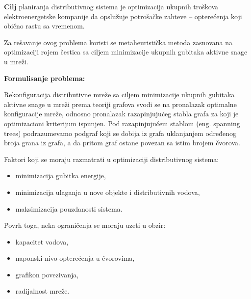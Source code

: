 \documentclass[a4paper]{article}
\begin{document}
\textbf{Cilj} planiranja distributivnog sistema je optimizacija ukupnih troškova elektroenergetske kompanije da opslužuje potrošačke zahteve – opterećenja koji obično rastu sa vremenom.

Za rešavanje ovog problema koristi se metaheuristička metoda zasnovana na optimizaciji rojem čestica sa ciljem minimizacije ukupnih gubitaka aktivne snage u mreži. 

\begin{flushleft}
\textbf{Formulisanje problema:} 
\end{flushleft}

Rekonfiguracija distributivne mreže sa ciljem minimizacije ukupnih gubitaka aktivne snage u mreži prema teoriji grafova svodi se na pronalazak optimalne konfiguracije mreže, odnosno pronalazak razapinjujućeg stabla grafa za koji je optimizacioni kriterijum ispunjen. Pod razapinjujućem stablom (eng. spanning trees) podrazumevamo podgraf koji se dobija iz grafa uklanjanjem određenog broja  grana iz grafa, a da pritom graf ostane povezan sa istim brojem čvorova. 

\vspace{3mm} 

\begin{flushleft}
Faktori koji se moraju razmatrati  u optimizaciji distributivnog sistema:
\end{flushleft}

\begin{itemize}
    \item minimizacija gubitka energije,
    \item minimizacija ulaganja u nove objekte i distributivnih vodova,
    \item maksimizacija pouzdanosti sistema.
\end{itemize}

\begin{flushleft}
Povrh toga, neka ograničenja se moraju uzeti u obzir:
\end{flushleft}

\begin{itemize}
    \item kapacitet vodova,
    \item naponski nivo opterećenja u čvorovima,
    \item grafikon povezivanja,
    \item radijalnost mreže.
\end{itemize}

\vspace{3mm} 
\end{document}
